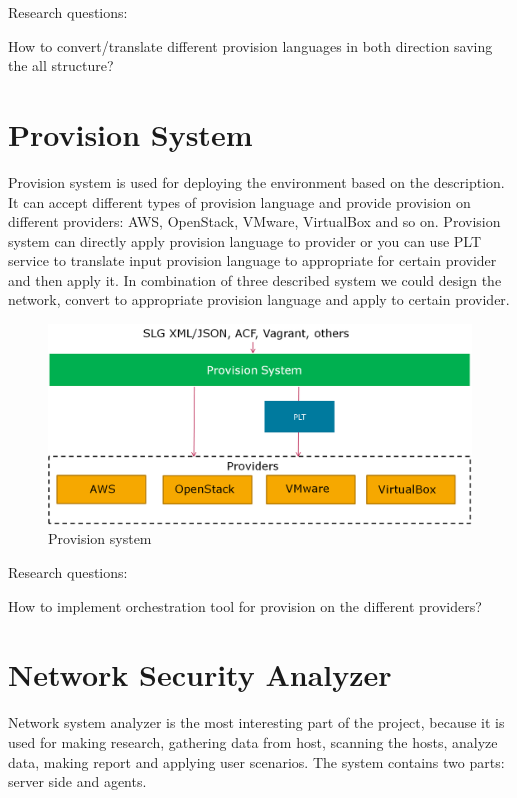 \documentclass[twoside]{article}
\newcommand{\myPS}{Provision System}
\newcommand{\myNSA}{Network Security Analyzer}
\begin{document}
Research questions:
\begin{compactitem}
\item How to convert/translate different provision languages in both direction saving the all structure?
\end{compactitem}  

\section{\myPS}
Provision system is used for deploying the environment based on the description. It can accept different types of provision language and provide provision on different providers: AWS, OpenStack, VMware, VirtualBox and so on. Provision system can directly apply provision language to provider or you can use PLT service to translate input provision language to appropriate for certain provider and then apply it. In combination of three described system we could design the network, convert to appropriate provision language and apply to certain provider. 

\begin{figure}[ht!]
\centering
\includegraphics[width=145mm]{ps.png}
\caption{Provision system}
\label{overflow}
\end{figure}

Research questions:
\begin{compactitem}
\item How to implement orchestration tool for provision on the different providers? 
\end{compactitem}


\section{\myNSA}
Network system analyzer is the most interesting part of the project, because it is used for making research, gathering data from host, scanning the hosts, analyze data, making report and applying user scenarios. The system contains two parts: server side and agents. 
\end{document}
